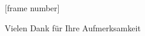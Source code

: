 \documentclass[10pt]{beamer}
\begin{document}
% 
% 
% 
% 
% 
% 
% 
% 
% 
% 
% 
\begin{frame}[allowframebreaks]
  \small{\printbibliography}
\end{frame}

{\nologo

[frame number]{} %




\begin{frame}[standout]
  Vielen Dank für Ihre Aufmerksamkeit
\end{frame}
}
\end{document}
